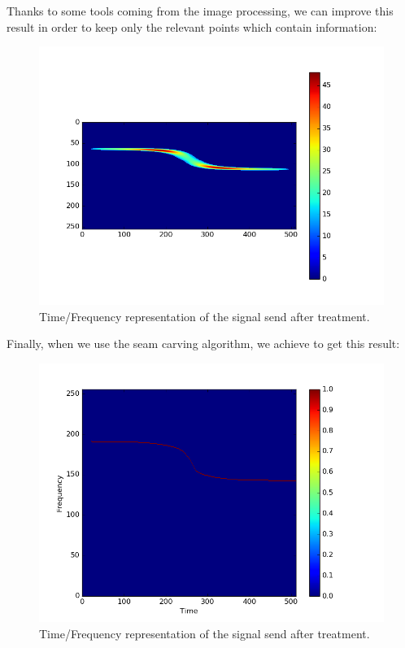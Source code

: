Thanks to some tools coming from the image processing, we can improve this result in order to keep only the relevant points which contain information:

\begin{figure}[H]
\centering
    \includegraphics[scale=0.7,angle=0]{Images/varseuil_signal.png}
    \caption{Time/Frequency representation of the signal send after treatment.}
    \label{fig:varseuil_signal}
\end{figure}

Finally, when we use the seam carving algorithm, we achieve to get this result:

\begin{figure}[H]
\centering
    \includegraphics[scale=0.7,angle=0]{Images/doopler_signal_esti.png}
    \caption{Time/Frequency representation of the signal send after treatment.}
    \label{fig:doopler_signal_spec}
\end{figure}

